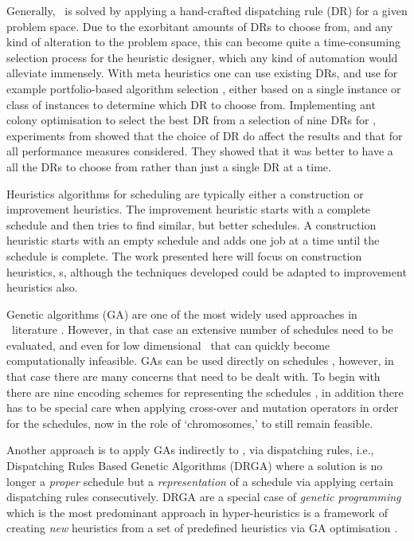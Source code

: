 \documentclass[smallextended]{svjour3}
\begin{document}
Generally, \jsp\ is solved by applying a hand-crafted dispatching rule (DR) for 
a given problem space. 
Due to the exorbitant amounts of DRs to choose from, and any kind of alteration 
to the problem space, this can become quite a time-consuming selection process 
for the heuristic designer, which any kind of automation would alleviate 
immensely. 
With meta heuristics one can use existing DRs, and use for example 
portfolio-based algorithm selection \cite{Rice76,Gomes01}, either based on a 
single instance or class of instances \cite{Xu07} to determine which DR to 
choose from. 
Implementing ant colony optimisation to select the best DR 
from a selection of nine DRs for \JSP, experiments from \cite{Korytkowski13} 
showed that the choice of DR do affect the results and that for all performance 
measures considered. They showed that it was better to have a all the DRs to 
choose from rather than just a single DR at a time.

Heuristics algorithms for scheduling are typically either a construction or 
improvement heuristics. The improvement heuristic starts with a complete 
schedule and then tries to find similar, but better schedules.  A construction 
heuristic starts with an empty schedule and adds one job at a time until the 
schedule is complete. The work presented here will focus on construction 
heuristics, \dr s, although the techniques developed could be adapted to 
improvement heuristics also. 


Genetic algorithms (GA) are one of the most widely used approaches in \JSP\ 
literature \cite{Pinedo08}. However, in that case an extensive number of 
schedules need to be evaluated, and even for low dimensional \JSP\ that can 
quickly become computationally infeasible.
GAs can be used directly on schedules 
\cite{Cheng96,Cheng99,Tsai07,Qing-dao-er-ji12,Ak12,Meeran12}, however, in that 
case there are many concerns that need to be dealt with. To begin with there 
are nine encoding schemes for representing the schedules \cite{Cheng96}, in 
addition there has to be special care when applying cross-over and mutation 
operators in order for the schedules, now in the role of `chromosomes,' to 
still remain feasible. 

Another approach is to apply GAs indirectly to \JSP , via dispatching rules, 
i.e., Dispatching Rules Based Genetic Algorithms (DRGA) 
\cite{Vazquez-Rodriguez09,Dhingra10,Nguyen13} where a solution is no longer a 
\emph{proper} schedule but a \emph{representation} of a schedule via applying 
certain dispatching rules consecutively. 
DRGA are a special case of \emph{genetic programming} \cite{Koza05} which is 
the most predominant approach in hyper-heuristics is a framework of creating 
\emph{new} heuristics from a set of  predefined heuristics via GA optimisation 
\cite{Burke10}. 
\end{document}
